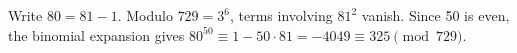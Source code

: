 Write $80=81-1$. Modulo $729=3^6$, terms involving $81^2$ vanish. Since 50 is even, the binomial expansion gives $80^{50}\equiv1-50\cdot81=-4049\equiv\boxed{325}\pmod{729}$.
